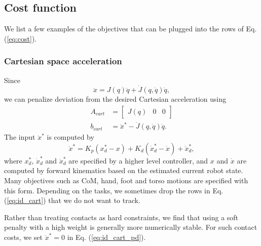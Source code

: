 \documentclass{ws-ijhr}
\newcommand{\eref}[1] {Eq. (\ref{#1})}
\begin{document}
\subsection{Cost function}
We list a few examples of the objectives that can be plugged into the rows of
\eref{eq:cost}. 
\subsubsection{Cartesian space acceleration} 
Since
\begin{equation*}
  \ddot{x} = J(q)\ddot{q} + \dot{J}(q,\dot{q})\dot{q},
\end{equation*}
we can penalize deviation from the desired Cartesian acceleration using
\begin{equation}
  \begin{split}
    A_{cart} &= \begin{bmatrix} J(q) & 0 & 0 \end{bmatrix} \\
    b_{cart} &= \ddot{x}^* -\dot{J}(q,\dot{q})\dot{q}.
		\label{eq:id_cart}
  \end{split}
\end{equation}  
The input $\ddot{x}^*$ is computed by
\begin{equation}
  \ddot{x}^* = K_p(x^*_d - x) + K_d(\dot{x}^*_d - \dot{x})  + \ddot{x}_d^*,
	\label{eq:id_cart_pd}
\end{equation}
where $x^*_d$, $\dot{x}^*_d$ and $\ddot{x}_d^*$ are specified by a higher 
level controller, and $x$ and $\dot{x}$ are computed by forward kinematics 
based on the estimated current robot state. 
Many objectives such as CoM, hand, foot and torso motions are 
specified with this form. Depending on the tasks, we sometimes drop the
rows in \eref{eq:id_cart} that we do not want to track. 

Rather than treating contacts as hard constraints, we find that using a soft 
penalty with a high weight is generally more numerically stable.
For such contact costs, we set $\ddot{x}^* = 0$ in \eref{eq:id_cart_pd}.
\end{document}
